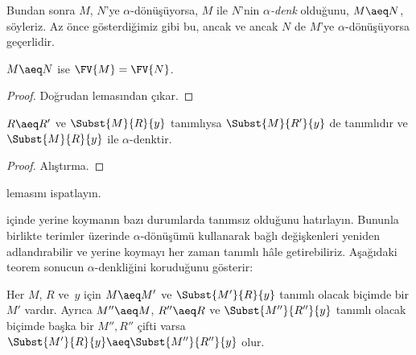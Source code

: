 Bundan sonra $M$, $N$'ye $\alpha$-dönüşüyorsa, $M$ ile $N$'nin
\emph{$\alpha$-denk} olduğunu, $M\aeq N$, söyleriz. Az önce gösterdiğimiz
gibi bu, ancak ve ancak $N$ de $M$'ye $\alpha$-dönüşüyorsa geçerlidir.

\begin{thm}
  $M \aeq N$ ise $\FV{M} = \FV{N}$.
\end{thm}

\begin{proof}
  Doğrudan  lemasından çıkar.
\end{proof}

\begin{lem}
  $R \aeq R'$ ve $\Subst{M}{R}{y}$ tanımlıysa $\Subst{M}{R'}{y}$ de
  tanımlıdır ve $\Subst{M}{R}{y}$ ile $\alpha$-denktir.
\end{lem}

\begin{proof}
  Alıştırma.
\end{proof}

\begin{prob}
   lemasını ispatlayın.
\end{prob}

 içinde yerine koymanın bazı durumlarda tanımsız olduğunu
hatırlayın. Bununla birlikte terimler üzerinde $\alpha$-dönüşümü kullanarak
bağlı değişkenleri yeniden adlandırabilir ve yerine koymayı her zaman tanımlı
hâle getirebiliriz. Aşağıdaki teorem sonucun $\alpha$-denkliğini koruduğunu
gösterir:

\begin{thm}
  Her $M$, $R$ ve~$y$ için $M \aeq M'$ ve $\Subst{M'}{R}{y}$ tanımlı
  olacak biçimde bir $M'$ vardır. Ayrıca $M''\aeq M$, $R''\aeq R$ ve
  $\Subst{M''}{R''}{y}$ tanımlı olacak biçimde başka bir $M'',R''$ çifti
  varsa $\Subst{M'}{R}{y} \aeq \Subst{M''}{R''}{y}$ olur.
\end{thm}

